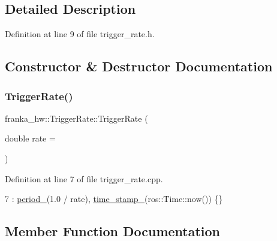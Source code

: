 \subsection{Detailed Description}


Definition at line 9 of file trigger\+\_\+rate.\+h.



\subsection{Constructor \& Destructor Documentation}
\mbox{\label{classfranka__hw_1_1TriggerRate_a68cde52c634b5bcb56f9276050a52e0d}} 
\subsubsection{\texorpdfstring{Trigger\+Rate()}{TriggerRate()}}
{\footnotesize\ttfamily franka\+\_\+hw\+::\+Trigger\+Rate\+::\+Trigger\+Rate (\begin{DoxyParamCaption}\item[{double}]{rate = {} }\end{DoxyParamCaption})\hspace{0.3cm}{\ttfamily [explicit]}}



Definition at line 7 of file trigger\+\_\+rate.\+cpp.


\begin{DoxyCode}
7 : \hyperlink{classfranka__hw_1_1TriggerRate_a447516b7353ac0f006eac0ad6c76a0d1}{period\_}(1.0 / rate), \hyperlink{classfranka__hw_1_1TriggerRate_a6cbf0023238a654a03405b33ef8272b5}{time\_stamp\_}(ros::Time::now()) \{\}
\end{DoxyCode}


\subsection{Member Function Documentation}
\mbox{\label{classfranka__hw_1_1TriggerRate_a808b03abfa76f0226ebac665ad8d3ce7}} 
